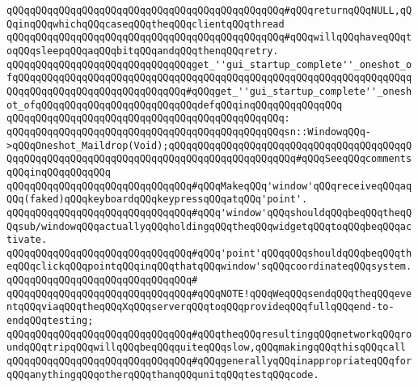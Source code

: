 \verb|qQQqqQQqqQQqqQQqqQQqqQQqqQQqqQQqqQQqqQQqqQQqqQQq#qQQqreturnqQQqNULL,qQQqinqQQqwhichqQQqcaseqQQqtheqQQqclientqQQqthread|\newline
\verb|qQQqqQQqqQQqqQQqqQQqqQQqqQQqqQQqqQQqqQQqqQQqqQQq#qQQqwillqQQqhaveqQQqtoqQQqsleepqQQqaqQQqbitqQQqandqQQqthenqQQqretry.|\newline
\newline
\newline
\verb|qQQqqQQqqQQqqQQqqQQqqQQqqQQqqQQqget_''gui_startup_complete''_oneshot_ofqQQqqQQqqQQqqQQqqQQqqQQqqQQqqQQqqQQqqQQqqQQqqQQqqQQqqQQqqQQqqQQqqQQqqQQqqQQqqQQqqQQqqQQqqQQqqQQqqQQq#qQQqget_''gui_startup_complete''_oneshot_ofqQQqqQQqqQQqqQQqqQQqqQQqqQQqdefqQQqinqQQqqQQqqQQqqQQq|\newline
\verb|qQQqqQQqqQQqqQQqqQQqqQQqqQQqqQQqqQQqqQQqqQQqqQQq:|\newline
\verb|qQQqqQQqqQQqqQQqqQQqqQQqqQQqqQQqqQQqqQQqqQQqqQQqsn::WindowqQQq->qQQqOneshot_Maildrop(Void);qQQqqQQqqQQqqQQqqQQqqQQqqQQqqQQqqQQqqQQqqQQqqQQqqQQqqQQqqQQqqQQqqQQqqQQqqQQqqQQqqQQqqQQqqQQq#qQQqSeeqQQqcommentsqQQqinqQQqqQQqqQQq|\newline
\newline
\verb|qQQqqQQqqQQqqQQqqQQqqQQqqQQqqQQq#qQQqMakeqQQq'window'qQQqreceiveqQQqaqQQq(faked)qQQqkeyboardqQQqkeypressqQQqatqQQq'point'.|\newline
\verb|qQQqqQQqqQQqqQQqqQQqqQQqqQQqqQQq#qQQq'window'qQQqshouldqQQqbeqQQqtheqQQqsub/windowqQQqactuallyqQQqholdingqQQqtheqQQqwidgetqQQqtoqQQqbeqQQqactivate.|\newline
\verb|qQQqqQQqqQQqqQQqqQQqqQQqqQQqqQQq#qQQq'point'qQQqqQQqshouldqQQqbeqQQqtheqQQqclickqQQqpointqQQqinqQQqthatqQQqwindow'sqQQqcoordinateqQQqsystem.|\newline
\verb|qQQqqQQqqQQqqQQqqQQqqQQqqQQqqQQq#|\newline
\verb|qQQqqQQqqQQqqQQqqQQqqQQqqQQqqQQq#qQQqNOTE!qQQqWeqQQqsendqQQqtheqQQqeventqQQqviaqQQqtheqQQqXqQQqserverqQQqtoqQQqprovideqQQqfullqQQqend-to-endqQQqtesting;|\newline
\verb|qQQqqQQqqQQqqQQqqQQqqQQqqQQqqQQq#qQQqtheqQQqresultingqQQqnetworkqQQqroundqQQqtripqQQqwillqQQqbeqQQqquiteqQQqslow,qQQqmakingqQQqthisqQQqcall|\newline
\verb|qQQqqQQqqQQqqQQqqQQqqQQqqQQqqQQq#qQQqgenerallyqQQqinappropriateqQQqforqQQqanythingqQQqotherqQQqthanqQQqunitqQQqtestqQQqcode.|\newline
